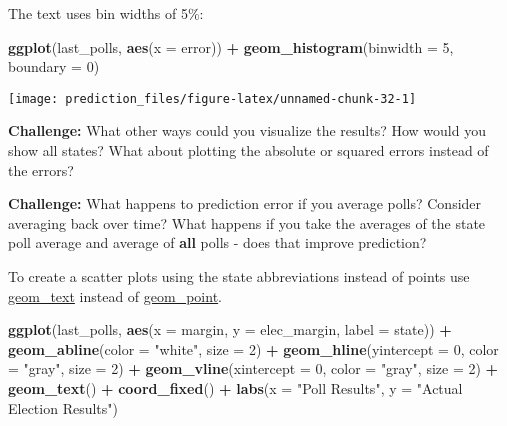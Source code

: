 \documentclass[]{book}
\newenvironment{Shaded}{\begin{snugshade}}{\end{snugshade}}
\newcommand{\DataTypeTok}[1]{\textcolor[rgb]{0.13,0.29,0.53}{#1}}
\newcommand{\DecValTok}[1]{\textcolor[rgb]{0.00,0.00,0.81}{#1}}
\newcommand{\KeywordTok}[1]{\textcolor[rgb]{0.13,0.29,0.53}{\textbf{#1}}}
\newcommand{\NormalTok}[1]{#1}
\newcommand{\OperatorTok}[1]{\textcolor[rgb]{0.81,0.36,0.00}{\textbf{#1}}}
\newcommand{\StringTok}[1]{\textcolor[rgb]{0.31,0.60,0.02}{#1}}
\theoremstyle{definition}
\theoremstyle{definition}
\theoremstyle{definition}
\theoremstyle{remark}
\begin{document}
The text uses bin widths of 5\%:

\begin{Shaded}
\begin{Highlighting}[]
\KeywordTok{ggplot}\NormalTok{(last_polls, }\KeywordTok{aes}\NormalTok{(}\DataTypeTok{x =}\NormalTok{ error)) }\OperatorTok{+}
\StringTok{  }\KeywordTok{geom_histogram}\NormalTok{(}\DataTypeTok{binwidth =} \DecValTok{5}\NormalTok{, }\DataTypeTok{boundary =} \DecValTok{0}\NormalTok{)}
\end{Highlighting}
\end{Shaded}

\begin{center}\texttt{[image: prediction\_files/figure-latex/unnamed-chunk-32-1]} \end{center}

\textbf{Challenge:} What other ways could you visualize the results? How
would you show all states? What about plotting the absolute or squared
errors instead of the errors?

\textbf{Challenge:} What happens to prediction error if you average
polls? Consider averaging back over time? What happens if you take the
averages of the state poll average and average of \textbf{all} polls -
does that improve prediction?

To create a scatter plots using the state abbreviations instead of
points use
\href{http://docs.ggplot2.org/current/geom_text.html}{geom\_text}
instead of
\href{http://docs.ggplot2.org/current/geom_point.html}{geom\_point}.

\begin{Shaded}
\begin{Highlighting}[]
\KeywordTok{ggplot}\NormalTok{(last_polls, }\KeywordTok{aes}\NormalTok{(}\DataTypeTok{x =}\NormalTok{ margin, }\DataTypeTok{y =}\NormalTok{ elec_margin, }\DataTypeTok{label =}\NormalTok{ state)) }\OperatorTok{+}
\StringTok{  }\KeywordTok{geom_abline}\NormalTok{(}\DataTypeTok{color =} \StringTok{"white"}\NormalTok{, }\DataTypeTok{size =} \DecValTok{2}\NormalTok{) }\OperatorTok{+}
\StringTok{  }\KeywordTok{geom_hline}\NormalTok{(}\DataTypeTok{yintercept =} \DecValTok{0}\NormalTok{, }\DataTypeTok{color =} \StringTok{"gray"}\NormalTok{, }\DataTypeTok{size =} \DecValTok{2}\NormalTok{) }\OperatorTok{+}
\StringTok{  }\KeywordTok{geom_vline}\NormalTok{(}\DataTypeTok{xintercept =} \DecValTok{0}\NormalTok{, }\DataTypeTok{color =} \StringTok{"gray"}\NormalTok{, }\DataTypeTok{size =} \DecValTok{2}\NormalTok{) }\OperatorTok{+}
\StringTok{  }\KeywordTok{geom_text}\NormalTok{() }\OperatorTok{+}
\StringTok{  }\KeywordTok{coord_fixed}\NormalTok{() }\OperatorTok{+}
\StringTok{  }\KeywordTok{labs}\NormalTok{(}\DataTypeTok{x =} \StringTok{"Poll Results"}\NormalTok{, }\DataTypeTok{y =} \StringTok{"Actual Election Results"}\NormalTok{)}
\end{Highlighting}
\end{Shaded}
\end{document}
